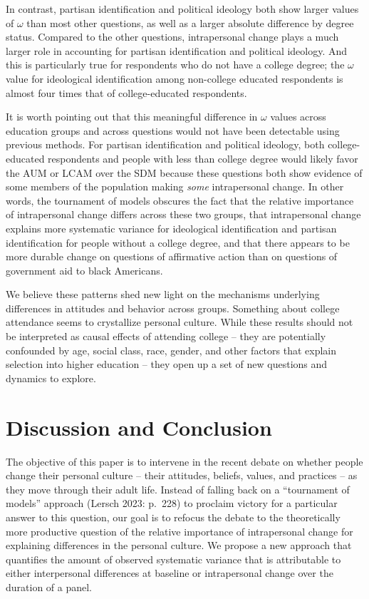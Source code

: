 \documentclass[
  12pt,
]{article}
\begin{document}
In contrast, partisan identification and political ideology both show
larger values of \(\omega\) than most other questions, as well as a
larger absolute difference by degree status. Compared to the other
questions, intrapersonal change plays a much larger role in accounting
for partisan identification and political ideology. And this is
particularly true for respondents who do not have a college degree; the
\(\omega\) value for ideological identification among non-college
educated respondents is almost four times that of college-educated
respondents.

It is worth pointing out that this meaningful difference in \(\omega\)
values across education groups and across questions would not have been
detectable using previous methods. For partisan identification and
political ideology, both college-educated respondents and people with
less than college degree would likely favor the AUM or LCAM over the SDM
because these questions both show evidence of some members of the
population making \emph{some} intrapersonal change. In other words, the
tournament of models obscures the fact that the relative importance of
intrapersonal change differs across these two groups, that intrapersonal
change explains more systematic variance for ideological identification
and partisan identification for people without a college degree, and
that there appears to be more durable change on questions of affirmative
action than on questions of government aid to black Americans.

We believe these patterns shed new light on the mechanisms underlying
differences in attitudes and behavior across groups. Something about
college attendance seems to crystallize personal culture. While these
results should not be interpreted as causal effects of attending college
-- they are potentially confounded by age, social class, race, gender,
and other factors that explain selection into higher education -- they
open up a set of new questions and dynamics to explore.

\hypertarget{discussion-and-conclusion}{%
\section{Discussion and Conclusion}\label{discussion-and-conclusion}}

The objective of this paper is to intervene in the recent debate on
whether people change their personal culture -- their attitudes,
beliefs, values, and practices -- as they move through their adult life.
Instead of falling back on a ``tournament of models'' approach (Lersch
2023: p.~228) to proclaim victory for a particular answer to this
question, our goal is to refocus the debate to the theoretically more
productive question of the relative importance of intrapersonal change
for explaining differences in the personal culture. We propose a new
approach that quantifies the amount of observed systematic variance that
is attributable to either interpersonal differences at baseline or
intrapersonal change over the duration of a panel.
\end{document}
